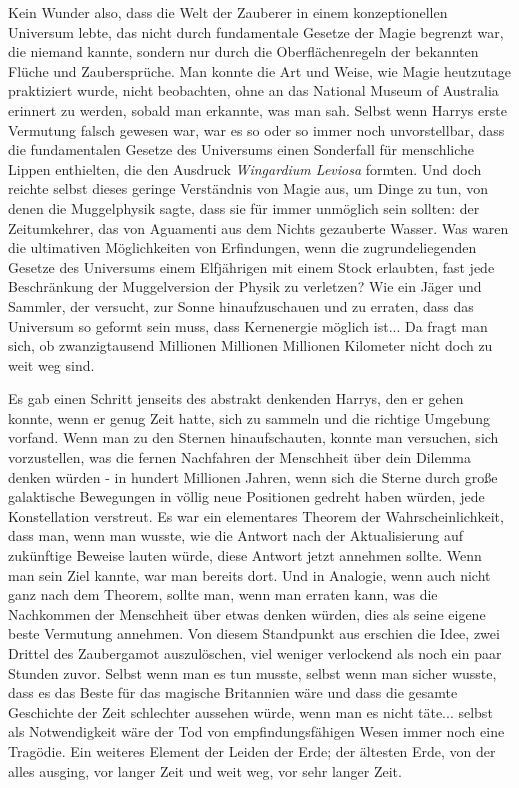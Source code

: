 Kein Wunder also, dass die Welt der Zauberer in einem konzeptionellen Universum
lebte, das nicht durch fundamentale Gesetze der Magie begrenzt war, die niemand
kannte, sondern nur durch die Oberflächenregeln der bekannten Flüche und
Zaubersprüche. Man konnte die Art und Weise, wie Magie heutzutage praktiziert
wurde, nicht beobachten, ohne an das National Museum of Australia erinnert zu
werden, sobald man erkannte, was man sah. Selbst wenn Harrys erste Vermutung
falsch gewesen war, war es so oder so immer noch unvorstellbar, dass die
fundamentalen Gesetze des Universums einen Sonderfall für menschliche Lippen
enthielten, die den Ausdruck \emph{\glqq{}Wingardium Leviosa\grqq{}} formten.
Und doch reichte selbst dieses geringe Verständnis von Magie aus, um Dinge zu
tun, von denen die Muggelphysik sagte, dass sie für immer unmöglich sein
sollten: der Zeitumkehrer, das von Aguamenti aus dem Nichts gezauberte Wasser.
Was waren die ultimativen Möglichkeiten von Erfindungen, wenn die
zugrundeliegenden Gesetze des Universums einem Elfjährigen mit einem Stock
erlaubten, fast jede Beschränkung der Muggelversion der Physik zu verletzen? Wie
ein Jäger und Sammler, der versucht, zur Sonne hinaufzuschauen und zu erraten,
dass das Universum so geformt sein muss, dass Kernenergie möglich ist... Da
fragt man sich, ob zwanzigtausend Millionen Millionen Millionen Kilometer nicht
doch zu weit weg sind.

Es gab einen Schritt jenseits des abstrakt denkenden Harrys, den er gehen
konnte, wenn er genug Zeit hatte, sich zu sammeln und die richtige Umgebung
vorfand. Wenn man zu den Sternen hinaufschauten, konnte man versuchen, sich
vorzustellen, was die fernen Nachfahren der Menschheit über dein Dilemma denken
würden - in hundert Millionen Jahren, wenn sich die Sterne durch große
galaktische Bewegungen in völlig neue Positionen gedreht haben würden, jede
Konstellation verstreut. Es war ein elementares Theorem der Wahrscheinlichkeit,
dass man, wenn man wusste, wie die Antwort nach der Aktualisierung auf
zukünftige Beweise lauten würde, diese Antwort jetzt annehmen sollte. Wenn man
sein Ziel kannte, war man bereits dort. Und in Analogie, wenn auch nicht ganz
nach dem Theorem, sollte man, wenn man erraten kann, was die Nachkommen der
Menschheit über etwas denken würden, dies als seine eigene beste Vermutung
annehmen. Von diesem Standpunkt aus erschien die Idee, zwei Drittel des
Zaubergamot auszulöschen, viel weniger verlockend als noch ein paar Stunden
zuvor. Selbst wenn man es tun musste, selbst wenn man sicher wusste, dass es das
Beste für das magische Britannien wäre und dass die gesamte Geschichte der Zeit
schlechter aussehen würde, wenn man es nicht täte... selbst als Notwendigkeit
wäre der Tod von empfindungsfähigen Wesen immer noch eine Tragödie. Ein weiteres
Element der Leiden der Erde; der ältesten Erde, von der alles ausging, vor
langer Zeit und weit weg, vor sehr langer Zeit.

